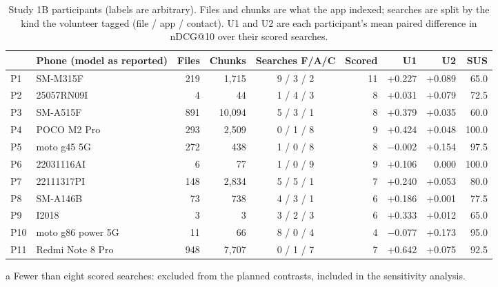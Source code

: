 \documentclass[11pt,a4paper]{article}
\makeatletter
\newcommand{\ndcg}{nDCG@10}
\makeatother
\begin{document}
\begin{table}[tbp]
\centering\footnotesize\setlength{\tabcolsep}{4pt}
\begin{threeparttable}
\caption{Study 1B participants (labels are arbitrary). Files and chunks are what the app indexed; searches are split by the kind the volunteer tagged (file / app / contact). U1 and U2 are each participant's mean paired difference in \ndcg{} over their scored searches.}
\label{tab:s1bpart}
\begin{tabular}{llrrcrrrr}
\toprule
 & Phone (model as reported) & Files & Chunks & Searches F/A/C & Scored & U1 & U2 & SUS \\
\midrule
P1 & SM-M315F & 219 & 1,715 & 9 / 3 / 2 & 11 & +0.227 & +0.089 & 65.0 \\
P2 & 25057RN09I & 4 & 44 & 1 / 4 / 3 & 8 & +0.031 & +0.079 & 72.5 \\
P3 & SM-A515F & 891 & 10,094 & 5 / 3 / 1 & 8 & +0.379 & +0.035 & 60.0 \\
P4 & POCO M2 Pro & 293 & 2,509 & 0 / 1 / 8 & 9 & +0.424 & +0.048 & 100.0 \\
P5 & moto g45 5G & 272 & 438 & 1 / 0 / 8 & 8 & $-$0.002 & +0.154 & 97.5 \\
P6 & 22031116AI & 6 & 77 & 1 / 0 / 9 & 9 & +0.106 & 0.000 & 100.0 \\
\midrule
P7\tnote{a} & 22111317PI & 148 & 2,834 & 5 / 5 / 1 & 7 & +0.240 & +0.053 & 80.0 \\
P8\tnote{a} & SM-A146B & 73 & 738 & 4 / 3 / 1 & 6 & +0.186 & +0.001 & 77.5 \\
P9\tnote{a} & I2018 & 3 & 3 & 3 / 2 / 3 & 6 & +0.333 & +0.012 & 65.0 \\
P10\tnote{a} & moto g86 power 5G & 11 & 66 & 8 / 0 / 4 & 4 & $-$0.077 & +0.173 & 95.0 \\
P11\tnote{a} & Redmi Note 8 Pro & 948 & 7,707 & 0 / 1 / 7 & 7 & +0.642 & +0.075 & 92.5 \\
\bottomrule
\end{tabular}
\begin{tablenotes}\footnotesize
\item[a] Fewer than eight scored searches: excluded from the planned contrasts, included in the sensitivity analysis.
\end{tablenotes}
\end{threeparttable}
\end{table}
\end{document}
